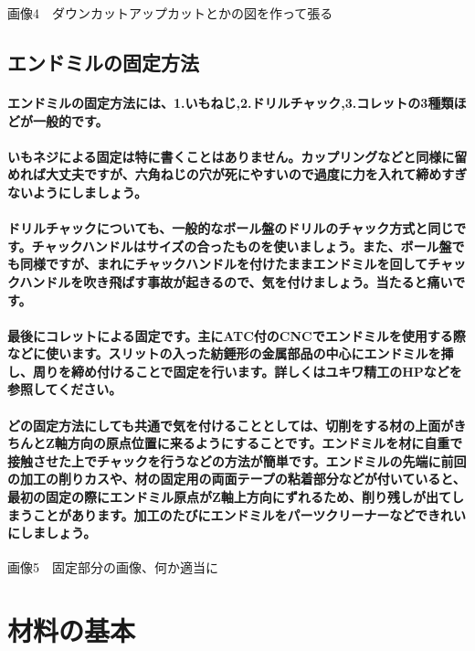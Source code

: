 \documentclass[b5paper, 9pt, twocolumn, titlepage,openany]{jsbook}%
\begin{document}
画像4　ダウンカットアップカットとかの図を作って張る

\subsection{エンドミルの固定方法}

\paragraph{エンドミルの固定方法には、1.いもねじ,2.ドリルチャック,3.コレットの3種類ほどが一般的です。}
\paragraph{いもネジによる固定は特に書くことはありません。カップリングなどと同様に留めれば大丈夫ですが、六角ねじの穴が死にやすいので過度に力を入れて締めすぎないようにしましょう。}
\paragraph{ドリルチャックについても、一般的なボール盤のドリルのチャック方式と同じです。チャックハンドルはサイズの合ったものを使いましょう。また、ボール盤でも同様ですが、まれにチャックハンドルを付けたままエンドミルを回してチャックハンドルを吹き飛ばす事故が起きるので、気を付けましょう。当たると痛いです。}
\paragraph{最後にコレットによる固定です。主にATC付のCNCでエンドミルを使用する際などに使います。スリットの入った紡錘形の金属部品の中心にエンドミルを挿し、周りを締め付けることで固定を行います。詳しくはユキワ精工のHPなどを参照してください。}
\paragraph{どの固定方法にしても共通で気を付けることとしては、切削をする材の上面がきちんとZ軸方向の原点位置に来るようにすることです。エンドミルを材に自重で接触させた上でチャックを行うなどの方法が簡単です。エンドミルの先端に前回の加工の削りカスや、材の固定用の両面テープの粘着部分などが付いていると、最初の固定の際にエンドミル原点がZ軸上方向にずれるため、削り残しが出てしまうことがあります。加工のたびにエンドミルをパーツクリーナーなどできれいにしましょう。}

画像5　固定部分の画像、何か適当に

\section{材料の基本}
\end{document}

